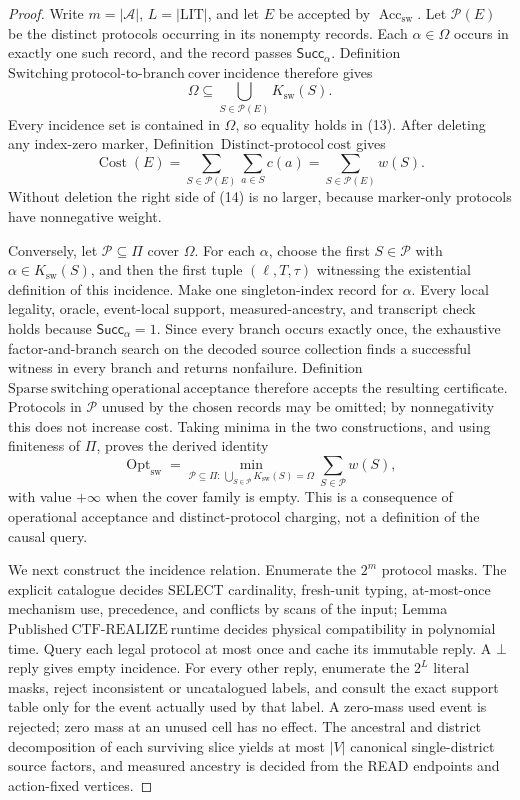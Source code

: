 \documentclass{article}
\begin{document}
\begin{proof}
Write \(m=|\mathcal A|\), \(L=|\mathrm{LIT}|\), and let \(E\) be accepted by \(\operatorname{Acc}_{\mathrm{sw}}\).  Let \(\mathcal P(E)\) be the distinct protocols occurring in its nonempty records.  Each \(\alpha\in\Omega\) occurs in exactly one such record, and the record passes \(\mathsf{Succ}_{\alpha}\).  Definition~\(\mathrm{Switching\ protocol\mbox{-}to\mbox{-}branch\ cover\ incidence}\) therefore gives
\[
 \Omega\subseteq\bigcup_{S\in\mathcal P(E)}K_{\mathrm{sw}}(S).
 \tag{13}
\]
Every incidence set is contained in \(\Omega\), so equality holds in (13).  After deleting any index-zero marker, Definition~\(\mathrm{Distinct\mbox{-}protocol\ cost}\) gives
\[
 \operatorname{Cost}(E)
 =\sum_{S\in\mathcal P(E)}\sum_{a\in S}c(a)
 =\sum_{S\in\mathcal P(E)}w(S).
 \tag{14}
\]
Without deletion the right side of (14) is no larger, because marker-only protocols have nonnegative weight.

Conversely, let \(\mathcal P\subseteq\Pi\) cover \(\Omega\).  For each \(\alpha\), choose the first \(S\in\mathcal P\) with \(\alpha\in K_{\mathrm{sw}}(S)\), and then the first tuple \((\ell,T,\tau)\) witnessing the existential definition of this incidence.  Make one singleton-index record for \(\alpha\).  Every local legality, oracle, event-local support, measured-ancestry, and transcript check holds because \(\mathsf{Succ}_{\alpha}=1\).  Since every branch occurs exactly once, the exhaustive factor-and-branch search on the decoded source collection finds a successful witness in every branch and returns nonfailure.  Definition~\(\mathrm{Sparse\ switching\ operational\ acceptance}\) therefore accepts the resulting certificate.  Protocols in \(\mathcal P\) unused by the chosen records may be omitted; by nonnegativity this does not increase cost.  Taking minima in the two constructions, and using finiteness of \(\Pi\), proves the derived identity
\[
 \operatorname{Opt}_{\mathrm{sw}}
 =\min_{\mathcal P\subseteq\Pi:\,\bigcup_{S\in\mathcal P}K_{\mathrm{sw}}(S)=\Omega}
   \sum_{S\in\mathcal P}w(S),
 \tag{15}
\]
with value \(+\infty\) when the cover family is empty.  This is a consequence of operational acceptance and distinct-protocol charging, not a definition of the causal query.

We next construct the incidence relation.  Enumerate the \(2^m\) protocol masks.  The explicit catalogue decides SELECT cardinality, fresh-unit typing, at-most-once mechanism use, precedence, and conflicts by scans of the input; Lemma~\(\mathrm{Published\ CTF\mbox{-}REALIZE\ runtime}\) decides physical compatibility in polynomial time.  Query each legal protocol at most once and cache its immutable reply.  A \(\bot\) reply gives empty incidence.  For every other reply, enumerate the \(2^L\) literal masks, reject inconsistent or uncatalogued labels, and consult the exact support table only for the event actually used by that label.  A zero-mass used event is rejected; zero mass at an unused cell has no effect.  The ancestral and district decomposition of each surviving slice yields at most \(|V|\) canonical single-district source factors, and measured ancestry is decided from the READ endpoints and action-fixed vertices.


\end{proof}
\end{document}
